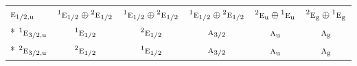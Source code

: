 \documentclass[10pt,a4paper]{article}
\numberwithin{equation}{section}
\newcommand{\irr}[1]{\text{\normalfont\scshape #1}}
\newcommand{\conjpair}[1]{{}^{#1}}
\newcommand{\ptag}[1]{\mathrm{#1}}
\begin{document}
{\begin{longtable}{@{}lccccc@{}}
$\irr{e}_{1/2,\ptag{u}}$ & $\conjpair{1}\irr{e}_{1/2}\oplus \conjpair{2}\irr{e}_{1/2}$ & $\conjpair{1}\irr{e}_{1/2}\oplus \conjpair{2}\irr{e}_{1/2}$ & $\conjpair{1}\irr{e}_{1/2}\oplus \conjpair{2}\irr{e}_{1/2}$ & $\conjpair{2}\irr{e}_{\ptag{u}}\oplus \conjpair{1}\irr{e}_{\ptag{u}}$ & $\conjpair{2}\irr{e}_{\ptag{g}}\oplus \conjpair{1}\irr{e}_{\ptag{g}}$\\*
$\conjpair{1}\irr{e}_{3/2,\ptag{u}}$ & $\conjpair{1}\irr{e}_{1/2}$ & $\conjpair{2}\irr{e}_{1/2}$ & $\irr{a}_{3/2}$ & $\irr{a}_{\ptag{u}}$ & $\irr{a}_{\ptag{g}}$\\*
$\conjpair{2}\irr{e}_{3/2,\ptag{u}}$ & $\conjpair{2}\irr{e}_{1/2}$ & $\conjpair{1}\irr{e}_{1/2}$ & $\irr{a}_{3/2}$ & $\irr{a}_{\ptag{u}}$ & $\irr{a}_{\ptag{g}}$\\
\bottomrule\end{longtable}}
\end{document}
